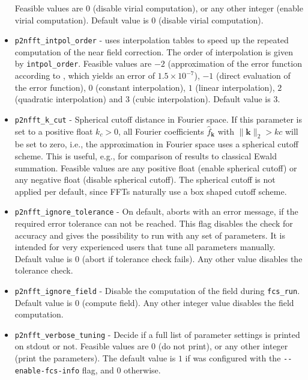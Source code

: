 \begin{itemize}
    Feasible values are $0$ (disable virial computation), or any other integer (enable virial computation).
    Default value is $0$ (disable virial computation).
  \item \verb!p2nfft_intpol_order! -
    \ptwonfft uses interpolation tables to speed up the repeated computation of the near field correction. The order of interpolation is given by \verb!intpol_order!.
    Feasible values are $-2$ (approximation of the error function according to \cite[eq.~(7.1.26)]{AbSt72}, which yields an error of $1.5\times 10^{-7}$),
    $-1$ (direct evaluation of the error function), $0$ (constant interpolation), $1$ (linear interpolation), $2$ (quadratic interpolation) and $3$ (cubic interpolation).
    Default value is $3$.
  \item \verb!p2nfft_k_cut! -
    Spherical cutoff distance in Fourier space. If this parameter is set to a positive float $k_c>0$, all Fourier coefficients $\hat f_{\mathbf k}$ with
    $\|\mathbf k\|_2 > kc$ will be set to zero, i.e., the approximation in Fourier space uses a spherical cutoff scheme.
    This is useful, e.g., for comparison of results to classical Ewald summation.
    Feasible values are any positive float (enable spherical cutoff) or any negative float (disable spherical cutoff).
    The spherical cutoff is not applied per default, since FFTs naturally use a box shaped cutoff scheme.
  \item \verb!p2nfft_ignore_tolerance! -
    On default, \ptwonfft aborts with an error message, if the required error tolerance can not be reached.
    This flag disables the check for accuracy and gives the possibility to run \ptwonfft
    with any set of parameters. It is intended for very experienced users that tune all parameters manually.
    Default value is $0$ (abort if tolerance check fails). Any other value disables the tolerance check.
  \item \verb!p2nfft_ignore_field! -
    Disable the computation of the field during \verb!fcs_run!.
    Default value is $0$ (compute field). Any other integer value disables the field computation.
  \item \verb!p2nfft_verbose_tuning! -
    Decide if a full list of \ptwonfft parameter settings is printed on stdout or not.
    Feasible values are $0$ (do not print), or any other integer (print the parameters).
    The default value is $1$ if \project was configured with the \verb+--enable-fcs-info+ flag, and $0$ otherwise.
\end{itemize}

